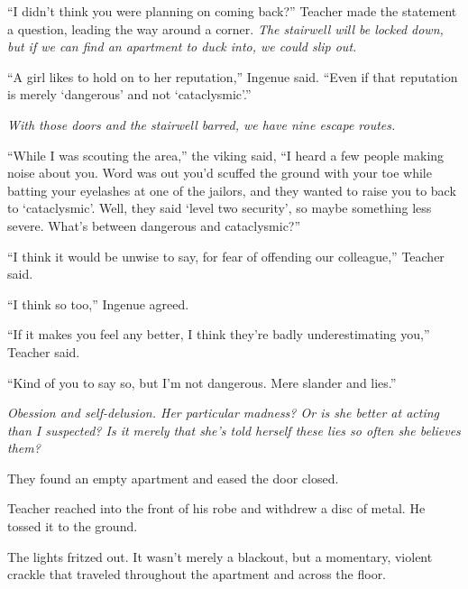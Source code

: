 ``I didn't think you were planning on coming back?'' Teacher made the statement a question, leading the way around a corner.  \emph{The stairwell will be locked down, but if we can find an apartment to duck into, we could slip out.}



``A girl likes to hold on to her reputation,'' Ingenue said.  ``Even if that reputation is merely `dangerous' and not `cataclysmic'.''



\emph{With those doors and the stairwell barred, we have nine escape routes.}



``While I was scouting the area,'' the viking said, ``I heard a few people making noise about you.  Word was out you'd scuffed the ground with your toe while batting your eyelashes at one of the jailors, and they wanted to raise you to back to `cataclysmic'.  Well, they said `level two security', so maybe something less severe.  What's between dangerous and cataclysmic?''



``I think it would be unwise to say, for fear of offending our colleague,'' Teacher said.



``I think so too,'' Ingenue agreed.



``If it makes you feel any better, I think they're badly underestimating you,'' Teacher said.



``Kind of you to say so, but I'm not dangerous.  Mere slander and lies.''



\emph{Obession and self-delusion.  Her particular madness?  Or is she better at acting than I suspected?  Is it merely that she's told herself these lies so often she believes them?}



They found an empty apartment and eased the door closed.



Teacher reached into the front of his robe and withdrew a disc of metal.  He tossed it to the ground.



The lights fritzed out.  It wasn't merely a blackout, but a momentary, violent crackle that traveled throughout the apartment and across the floor.



